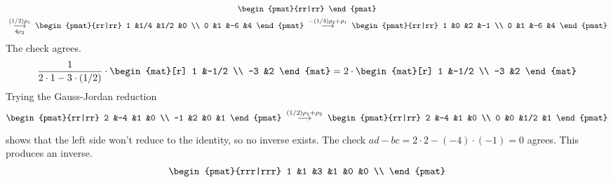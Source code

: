 \begin{exercises}
\begin{answer}
\begin{exparts}
\begin{multline*}
\begin{pmat}{rr|rr}
            \end{pmat}                       \\
            \;\grstep[4\rho_2]{(1/2)\rho_1}\;
            \begin{pmat}{rr|rr}
              1  &1/4   &1/2   &0  \\
              0  &1     &-6    &4
            \end{pmat}                         
            \;\grstep{-(1/4)\rho_2+\rho_1}\;
            \begin{pmat}{rr|rr}
              1  &0     &2     &-1 \\
              0  &1     &-6    &4
            \end{pmat}
          \end{multline*}
          The check agrees.
          \begin{equation*}
            \frac{1}{2\cdot 1-3\cdot (1/2)}\cdot
            \begin{mat}[r]
              1  &-1/2  \\
              -3 &2
            \end{mat}
            =2\cdot
            \begin{mat}[r]
              1  &-1/2  \\
              -3 &2
            \end{mat}
          \end{equation*}
        \partsitem Trying the Gauss-Jordan reduction
          \begin{equation*}
            \begin{pmat}{rr|rr}
              2  &-4  &1  &0  \\
             -1  &2   &0  &1 
            \end{pmat}
            \;\grstep{(1/2)\rho_1+\rho_2}\;
            \begin{pmat}{rr|rr}
              2  &-4  &1   &0  \\
              0  &0   &1/2 &1 
            \end{pmat}
          \end{equation*}
          shows that the left side won't reduce to the identity, so no inverse
          exists.
          The check $ad-bc=2\cdot 2-(-4)\cdot (-1)=0$ agrees.
        \partsitem This produces an inverse.
          \begin{multline*}
            \begin{pmat}{rrr|rrr}
              1  &1  &3  &1  &0  &0  \\ 

\end{pmat}
\end{multline*}
\end{exparts}
\end{answer}
\end{exercises}
